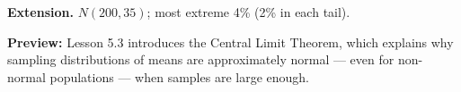 \documentclass[10pt]{article}
\begin{document}
\begin{extensionbox}
\textbf{Extension.} $N(200, 35)$; most extreme 4\% (2\% in each tail).\\
\end{extensionbox}

\begin{reflectionbox}
\textbf{Preview:} Lesson 5.3 introduces the Central Limit Theorem, which explains why
sampling distributions of means are approximately normal --- even for non-normal
populations --- when samples are large enough.
\end{reflectionbox}
\end{document}
